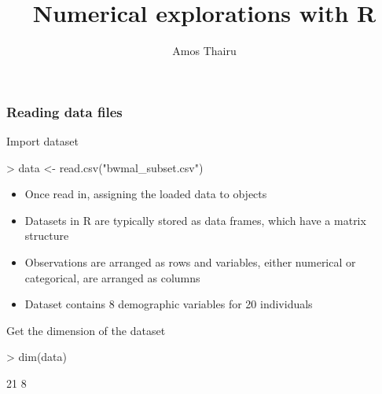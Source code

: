 \documentclass{beamer}
\title{Numerical explorations with R}
\author{Amos Thairu}
\begin{document}

\begin{frame}
\titlepage
\end{frame}


\begin{frame}[fragile]\frametitle{Reading data files}
Import dataset
\begin{Schunk}
\begin{Sinput}
> data <- read.csv("bwmal_subset.csv")
\end{Sinput}
\end{Schunk}
\pause
\begin{itemize}
  \item Once read in, assigning the loaded data to objects
  \item Datasets in R are typically stored as data frames, which have a matrix structure 
  \item Observations are arranged as rows and variables, either numerical or categorical, are arranged as columns
  \item Dataset contains 8 demographic variables for 20 individuals
\end{itemize}
\pause
Get the dimension of the dataset
\begin{Schunk}
\begin{Sinput}
> dim(data)
\end{Sinput}
\begin{Soutput}
[1] 21  8
\end{Soutput}
\end{Schunk}
\end{frame}
\end{document}
